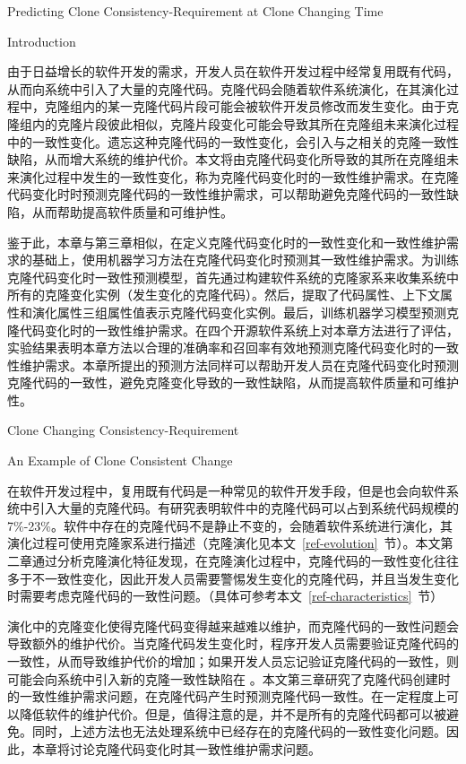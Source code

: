 
{Predicting Clone Consistency-Requirement at Clone Changing Time}

{Introduction}

由于日益增长的软件开发的需求，开发人员在软件开发过程中经常复用既有代码，从而向系统中引入了大量的克隆代码。克隆代码会随着软件系统演化，在其演化过程中，克隆组内的某一克隆代码片段可能会被软件开发员修改而发生变化。由于克隆组内的克隆片段彼此相似，克隆片段变化可能会导致其所在克隆组未来演化过程中的一致性变化。遗忘这种克隆代码的一致性变化，会引入与之相关的克隆一致性缺陷，从而增大系统的维护代价。本文将由克隆代码变化所导致的其所在克隆组未来演化过程中发生的一致性变化，称为克隆代码变化时的一致性维护需求。在克隆代码变化时时预测克隆代码的一致性维护需求，可以帮助避免克隆代码的一致性缺陷，从而帮助提高软件质量和可维护性。

鉴于此，本章与第三章相似，在定义克隆代码变化时的一致性变化和一致性维护需求的基础上，使用机器学习方法在克隆代码变化时预测其一致性维护需求。为训练克隆代码变化时一致性预测模型，首先通过构建软件系统的克隆家系来收集系统中所有的克隆变化实例（发生变化的克隆代码）。然后，提取了代码属性、上下文属性和演化属性三组属性值表示克隆代码变化实例。最后，训练机器学习模型预测克隆代码变化时的一致性维护需求。在四个开源软件系统上对本章方法进行了评估，实验结果表明本章方法以合理的准确率和召回率有效地预测克隆代码变化时的一致性维护需求。本章所提出的预测方法同样可以帮助开发人员在克隆代码变化时预测克隆代码的一致性，避免克隆变化导致的一致性缺陷，从而提高软件质量和可维护性。

{Clone Changing Consistency-Requirement}

{An Example of Clone Consistent Change }

在软件开发过程中，复用既有代码是一种常见的软件开发手段，但是也会向软件系统中引入大量的克隆代码。有研究表明软件中的克隆代码可以占到系统代码规模的7\%-23\%\cite{koschke2007survey}。软件中存在的克隆代码不是静止不变的，会随着软件系统进行演化，其演化过程可使用克隆家系进行描述\cite{kim2005empirical}（克隆演化见本文~\ref{ref-evolution}~节）。本文第二章通过分析克隆演化特征发现，在克隆演化过程中，克隆代码的一致性变化往往多于不一致性变化，因此开发人员需要警惕发生变化的克隆代码，并且当发生变化时需要考虑克隆代码的一致性问题。（具体可参考本文~\ref{ref-characteristics}~节）

演化中的克隆变化使得克隆代码变得越来越难以维护，而克隆代码的一致性问题会导致额外的维护代价。当克隆代码发生变化时，程序开发人员需要验证克隆代码的一致性，从而导致维护代价的增加；如果开发人员忘记验证克隆代码的一致性，则可能会向系统中引入新的克隆一致性缺陷在\cite{bettenburg2009empirical} \cite {juergens2009code}。本文第三章研究了克隆代码创建时的一致性维护需求问题，在克隆代码产生时预测克隆代码一致性。在一定程度上可以降低软件的维护代价。但是，值得注意的是，并不是所有的克隆代码都可以被避免。同时，上述方法也无法处理系统中已经存在的克隆代码的一致性变化问题。因此，本章将讨论克隆代码变化时其一致性维护需求问题。

